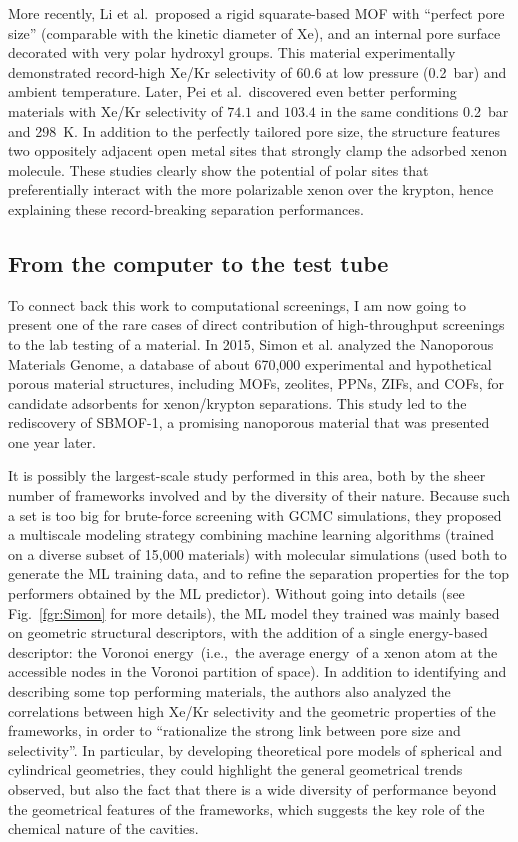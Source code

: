 \documentclass[main.tex]{subfiles}
\begin{document}
More recently, Li et al.\ proposed a rigid squarate-based MOF with ``perfect pore size'' (comparable with the kinetic diameter of Xe), and an internal pore surface decorated with very polar hydroxyl groups. This material experimentally demonstrated record-high Xe/Kr selectivity of $60.6$ at low pressure (\SI{0.2}{\bar}) and ambient temperature.\autocite{Li_2019} Later, Pei et al.\ discovered even better performing materials with Xe/Kr selectivity of $74.1$ and $103.4$ in the same conditions \SI{0.2}{\bar} and \SI{298}{\kelvin}. In addition to the perfectly tailored pore size, the structure features two oppositely adjacent open metal sites that strongly clamp the adsorbed xenon molecule.\autocite{Pei_2022} These studies clearly show the potential of polar sites that preferentially interact with the more polarizable xenon over the krypton, hence explaining these record-breaking separation performances. 

\subsection{From the computer to the test tube}

To connect back this work to computational screenings, I am now going to present one of the rare cases of direct contribution of high-throughput screenings to the lab testing of a material. In 2015, Simon et al.\autocite{Simon_2015} analyzed the Nanoporous Materials Genome,\autocite{Simon_2015_EES, Boyd_2017} a database of about 670,000 experimental and hypothetical porous material structures, including MOFs, zeolites, PPNs, ZIFs, and COFs, for candidate adsorbents for xenon/krypton separations. This study led to the rediscovery of SBMOF-1, a promising nanoporous material that was presented one year later.\autocite{Banerjee_2016}

It is possibly the largest-scale study performed in this area, both by the sheer number of frameworks involved and by the diversity of their nature. Because such a set is too big for brute-force screening with GCMC simulations, they proposed a multiscale modeling strategy combining machine learning algorithms (trained on a diverse subset of 15,000 materials) with molecular simulations (used both to generate the ML training data, and to refine the separation properties for the top performers obtained by the ML predictor). Without going into details (see Fig.~\ref{fgr:Simon} for more details), the ML model they trained was mainly based on geometric structural descriptors, with the addition of a single energy-based descriptor: the Voronoi energy\ (i.e.,\ the average energy\ of a xenon atom at the accessible nodes in the Voronoi partition of space). In addition to identifying and describing some top performing materials, the authors also analyzed the correlations between high Xe/Kr selectivity and the geometric properties of the frameworks, in order to ``rationalize the strong link between pore size and selectivity''. In particular, by developing theoretical pore models of spherical and cylindrical geometries, they could highlight the general geometrical trends observed, but also the fact that there is a wide diversity of performance beyond the geometrical features of the frameworks, which suggests the key role of the chemical nature of the cavities.
\end{document}
